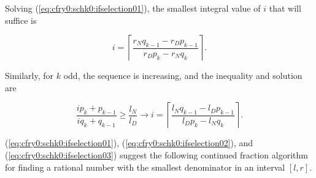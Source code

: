 Solving (\ref{eq:cfry0:schk0:ifselection01}), the smallest integral 
value of $i$ that will suffice is

\begin{equation}
\label{eq:cfry0:schk0:ifselection02}
i = \left\lceil {
\frac{r_N q_{k-1} - r_D p_{k-1}}{r_D p_k - r_N q_k}
} \right\rceil .
\end{equation}

Similarly, for $k$ odd, the sequence is increasing,
and the inequality and solution are

\begin{equation}
\label{eq:cfry0:schk0:ifselection03}
\frac{i p_k + p_{k-1}}{i q_k + q_{k-1}} \geq \frac{l_N}{l_D}
\to
i = \left\lceil {
\frac{l_N q_{k-1} - l_D p_{k-1}}{l_D p_k - l_N q_k}
} \right\rceil .
\end{equation}

(\ref{eq:cfry0:schk0:ifselection01}),
(\ref{eq:cfry0:schk0:ifselection02}),
and (\ref{eq:cfry0:schk0:ifselection03}) suggest the following continued fraction
algorithm for finding
a rational number with the smallest denominator in an
interval $[l,r]$.

